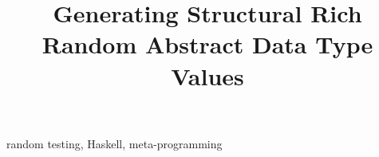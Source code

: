 \documentclass[conference, fleqn]{IEEEtran}
\begin{document}
\title{Generating Structural Rich \\ Random Abstract Data Type Values }

\author{
\and
{}
}

\maketitle


\newenvironment{CompactItemize}%
  {\begin{list}{$\, \  \blacktriangleright$}%
   {\leftmargin=0pt \itemsep=2pt \topsep=5pt
     \parsep=0pt \partopsep=0pt}}%
  {\end{list}}




\begin{IEEEkeywords}
random testing, Haskell, meta-programming
\end{IEEEkeywords}












\end{document}
